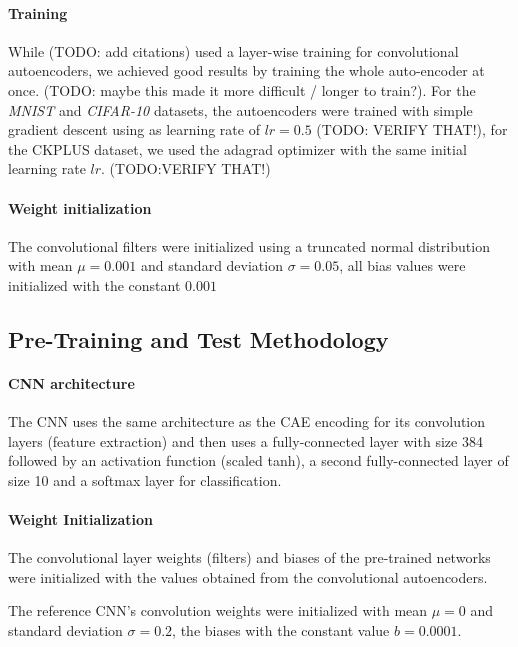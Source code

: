 \documentclass[draft]{article}
\begin{document}
    \paragraph{Training} While (TODO: add citations) used a layer-wise training for convolutional autoencoders, we achieved good results by training the whole auto-encoder at once. (TODO: maybe this made it more difficult / longer to train?). For the \emph{MNIST} and \emph{CIFAR-10} datasets, the autoencoders were trained with simple gradient descent using as learning rate of $lr = 0.5$ (TODO: VERIFY THAT!), for the CKPLUS dataset, we used the adagrad optimizer with the same initial learning rate $lr$. (TODO:VERIFY THAT!)


    \paragraph{Weight initialization} The convolutional filters were initialized using a truncated normal distribution with mean $\mu = 0.001$ and standard deviation $\sigma = 0.05$, all bias values were initialized with the constant $0.001$

  \subsection{Pre-Training and Test Methodology}

    \paragraph{CNN architecture} The CNN uses the same architecture as the CAE encoding for its convolution layers (feature extraction) and then uses a fully-connected layer with size 384 followed by an activation function (scaled tanh), a second fully-connected layer of size 10 and a softmax layer for classification. 

    \paragraph{Weight Initialization}

    The convolutional layer weights (filters) and biases of the pre-trained networks were initialized with the values obtained from the convolutional autoencoders.

    The reference CNN's convolution weights were initialized with mean $\mu = 0 $ and standard deviation $\sigma = 0.2$, the biases with the constant value $b =  0.0001$.
\end{document}
